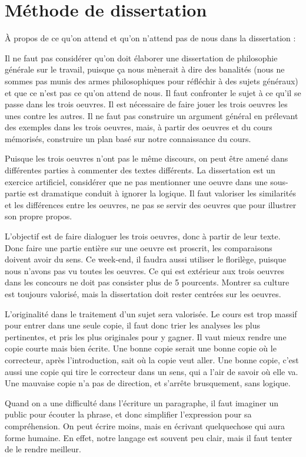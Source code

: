 \documentclass[a4paper,12pt]{book}
\begin{document}
\section{Méthode de dissertation}
À propos de ce qu'on attend et qu'on n'attend pas de nous dans la dissertation :
\par Il ne faut pas considérer qu'on doit élaborer une dissertation de philosophie générale sur le travail, puisque ça nous mènerait à dire des banalités (nous ne sommes pas munis des armes philosophiques pour réfléchir à des sujets généraux) et que ce n'est pas ce qu'on attend de nous. Il faut confronter le sujet à ce qu'il se passe dans les trois oeuvres. Il est nécessaire de faire jouer les trois oeuvres les unes contre les autres. Il ne faut pas construire un argument général en prélevant des exemples dans les trois oeuvres, mais, à partir des oeuvres et du cours mémorisés, construire un plan basé sur notre connaissance du cours.
\par Puisque les trois oeuvres n'ont pas le même discours, on peut être amené dans différentes parties à commenter des textes différents. La dissertation est un exercice artificiel, considérer que ne pas mentionner une oeuvre dans une sous-partie est dramatique conduit à ignorer la logique. Il faut valoriser les similarités et les différences entre les oeuvres, ne pas se servir des oeuvres que pour illustrer son propre propos.
\par L'objectif est de faire dialoguer les trois oeuvres, donc à partir de leur texte. Donc faire une partie entière sur une oeuvre est proscrit, les comparaisons doivent avoir du sens. Ce week-end, il faudra aussi utiliser le florilège, puisque nous n'avons pas vu toutes les oeuvres. Ce qui est extérieur aux trois oeuvres dans les concours ne doit pas consister plus de 5 pourcents. Montrer sa culture est toujours valorisé, mais la dissertation doit rester centrées sur les oeuvres.
\par L'originalité dans le traitement d'un sujet sera valorisée. Le cours est trop massif pour entrer dans une seule copie, il faut donc trier les analyses les plus pertinentes, et pris les plus originales pour y gagner. Il vaut mieux rendre une copie courte mais bien écrite. Une bonne copie serait une bonne copie où le correcteur, après l'introduction, sait où la copie veut aller. Une bonne copie, c'est aussi une copie qui tire le correcteur dans un sens, qui a l'air de savoir où elle va. Une mauvaise copie n'a pas de direction, et s'arrête brusquement, sans logique.
\par Quand on a une difficulté dans l'écriture un paragraphe, il faut imaginer un public pour écouter la phrase, et donc simplifier l'expression pour sa compréhension. On peut écrire moins, mais en écrivant quelquechose qui aura forme humaine. En effet, notre langage est souvent peu clair, mais il faut tenter de le rendre meilleur.
\end{document}
